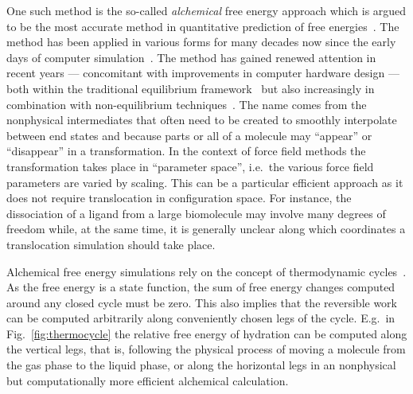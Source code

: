 \documentclass[journal=jctcce,manuscript=article]{achemso}
\begin{document}
One such method is the so-called \emph{alchemical} free energy
approach which is argued to be the most accurate method in quantitative
prediction of free energies~\cite{Beveridge-citeulike:3789890,
  straatsma:92, doi:10.1021/cr00023a004, hansen_practical_2014}.  The
method has been applied in various forms for many decades now since
the early days of computer simulation~\cite{doi:10.1063/1.1671118,
  bennett_efficient_1976, doi:10.1063/1.432264, FS9821700055,
  Tembe1984281, doi:10.1063/1.449208}.  The method has gained renewed
attention in recent years --- concomitant with improvements in
computer hardware design --- both within the traditional equilibrium
framework~\cite{GILSON19971047, doi:10.1021/jp0217839,
  deng_computations_2009} but also increasingly in combination with
non-equilibrium techniques~\cite{ytreberg_comparison_2006, JCC:JCC23804,
  doi:10.1021/ct500964e}.  The name comes from the nonphysical
intermediates that often need to be created to smoothly interpolate
between end states and because parts or all of a molecule may ``appear''
or ``disappear'' in a transformation.  In the context of force field
methods the transformation takes place in ``parameter space'', i.e.\ the
various force field parameters are varied by scaling.  
This can be a particular efficient approach as it does not require 
translocation in configuration space.
For instance, the dissociation of a ligand from
a large biomolecule may involve many degrees of freedom while, at the
same time, it is generally unclear along which coordinates a
translocation simulation should take place.

Alchemical free energy simulations rely on the concept of thermodynamic 
cycles~\cite{Tembe1984281}.
As the free energy is a state function, the sum of free energy changes
computed around any closed cycle must be zero.  This also implies
that the reversible work can be computed arbitrarily along
conveniently chosen legs of the cycle.  E.g.\ in
Fig.~\ref{fig:thermocycle} the relative free energy of hydration can
be computed along the vertical legs, that is, following the physical
process of moving a molecule from the gas phase to the liquid phase,
or along the horizontal legs in an nonphysical but computationally more
efficient alchemical calculation.
\end{document}
